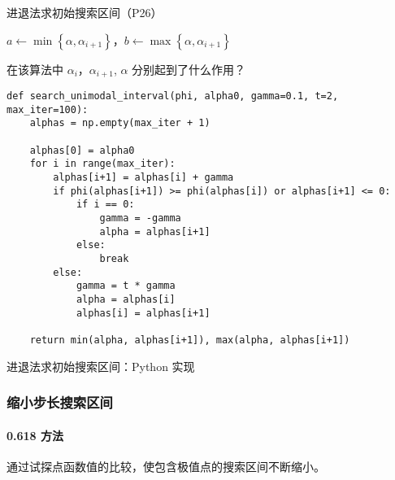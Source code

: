 \documentclass[cn]{elegantbook}
\begin{document}
\begin{algorithm}
    \caption{进退法求初始搜索区间（P26）}
    $a\leftarrow\min\left\{\alpha,\alpha_{i+1}\right\}$，$b\leftarrow\max\left\{\alpha,\alpha_{i+1}\right\}$\;
\end{algorithm}

\begin{remark}
    在该算法中 $\alpha_{i}$，$\alpha_{i+1}$, $\alpha$ 分别起到了什么作用？
\end{remark}

\begin{listing}
    \begin{verbatim}
def search_unimodal_interval(phi, alpha0, gamma=0.1, t=2, max_iter=100):
    alphas = np.empty(max_iter + 1)

    alphas[0] = alpha0
    for i in range(max_iter):
        alphas[i+1] = alphas[i] + gamma
        if phi(alphas[i+1]) >= phi(alphas[i]) or alphas[i+1] <= 0:
            if i == 0:
                gamma = -gamma
                alpha = alphas[i+1]
            else:
                break
        else:
            gamma = t * gamma
            alpha = alphas[i]
            alphas[i] = alphas[i+1]

    return min(alpha, alphas[i+1]), max(alpha, alphas[i+1])
    \end{verbatim}
    \caption{进退法求初始搜索区间：Python 实现}
\end{listing}

\subsubsection{缩小步长搜索区间}

\paragraph{0.618 方法}

通过试探点函数值的比较，使包含极值点的搜索区间不断缩小。
\end{document}
